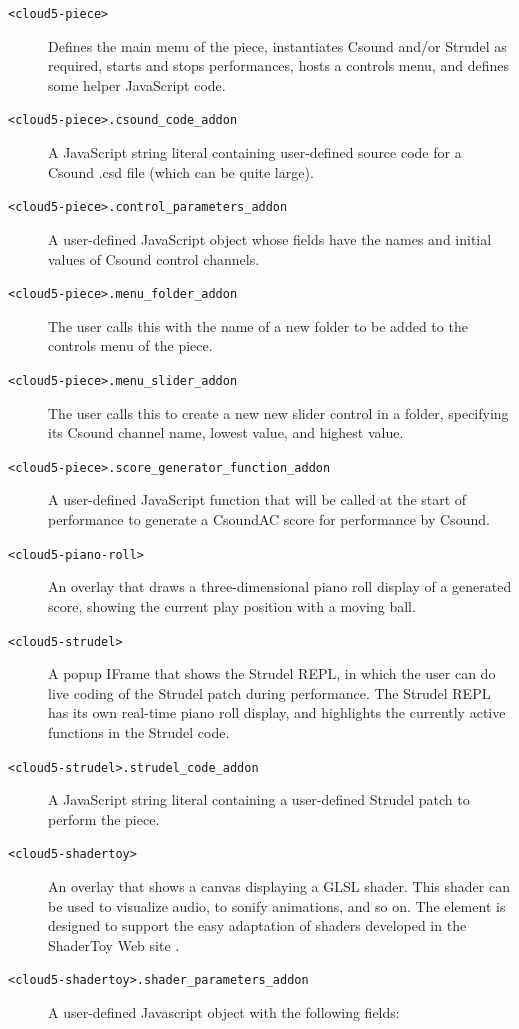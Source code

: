 \documentclass[runningheads,a4paper]{llncs}
\begin{document}
\begin{description}
\item[\texttt{<cloud5-piece>}] Defines the main menu of the piece, instantiates Csound and/or Strudel as required, starts and stops performances, hosts a controls menu, and defines some helper JavaScript code.
\item[\texttt{<cloud5-piece>.csound\_code\_addon}]  A JavaScript string literal containing user-defined source code for a Csound .csd file (which can be quite large).
\item[\texttt{<cloud5-piece>.control\_parameters\_addon}]  A user-defined JavaScript object whose fields have the names and initial values of Csound control channels.
\item[\texttt{<cloud5-piece>.menu\_folder\_addon}]  The user calls this with the name of a new folder to be added to the controls menu of the piece.
\item[\texttt{<cloud5-piece>.menu\_slider\_addon}]  The user calls this to create a new new slider control in a folder, specifying its Csound channel name, lowest value, and highest value.
\item[\texttt{<cloud5-piece>.score\_generator\_function\_addon}]  A user-defined JavaScript function that will be called at the start of performance to generate a CsoundAC score for performance by Csound. 
\item[\texttt{<cloud5-piano-roll>}] An overlay that draws a three-dimensional piano roll display of a generated score, showing the current play position with a moving ball.
\item[\texttt{<cloud5-strudel>}] A popup IFrame that shows the Strudel REPL, in which the user can do live coding of the Strudel patch during performance. The Strudel REPL has its own real-time piano roll display, and highlights the currently active functions in the Strudel code.
\item[\texttt{<cloud5-strudel>.strudel\_code\_addon}] A JavaScript string literal containing a user-defined  Strudel patch to perform the piece.
\item[\texttt{<cloud5-shadertoy>}] An overlay that shows a canvas displaying a GLSL shader. This shader can be used to visualize audio, to sonify animations, and so on. The element is designed to support the easy adaptation of shaders developed in the ShaderToy Web site \cite{shadertoy}.
\item[\texttt{<cloud5-shadertoy>.shader\_parameters\_addon}] A user-defined Javascript object with the following fields:
\begin{description}

\end{description}
\end{description}
\end{document}
